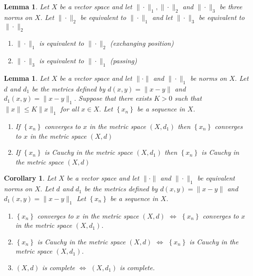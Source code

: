 \documentclass[10pt]{paper}
\newtheorem{corollary}{Corollary}[section]
\newtheorem{lemma}[theorem]{Lemma}
\begin{document}
\begin{lemma}
    Let $X$ be a vector space and let $\|\cdot\|_{1},\|\cdot\|_{2}$ and $\|\cdot\|_{3}$ be three norms on $X$. Let $\|\cdot\|_{2}$ be equivalent to $\|\cdot\|_{1}$ and let $\|\cdot\|_{3}$ be equivalent to $\|\cdot\|_{2}$
    \begin{enumerate}
        \item $\|\cdot\|_{1}$ is equivalent to $\|\cdot\|_{2}$ (exchanging position)
        \item $\|\cdot\|_{3}$ is equivalent to $\|\cdot\|_{1}$ (passing)
    \end{enumerate}
\end{lemma}

\begin{lemma}
    Let $X$ be a vector space and let $\|\cdot\|$ and $\|\cdot\|_{1}$ be norms on $X .$ Let $d$ and $d_{1}$ be the metrics defined by $d(x, y)=\|x-y\|$ and $d_{1}(x, y)=\|x-y\|_{1} .$ Suppose that there exists $K>0$ such that $\|x\| \leq K\|x\|_{1}$ for all $x \in X .$ Let $\left\{x_{n}\right\}$ be a sequence in $X$.
    \begin{enumerate}
        \item If $\left\{x_{n}\right\}$ converges to $x$ in the metric space $\left(X, d_{1}\right)$ then $\left\{x_{n}\right\}$ converges to $x$ in the metric space $(X, d)$
        \item If $\left\{x_{n}\right\}$ is Cauchy in the metric space $\left(X, d_{1}\right)$ then $\left\{x_{n}\right\}$ is Cauchy in the metric space $(X, d)$
    \end{enumerate}
\end{lemma}

\begin{corollary}
    Let $X$ be a vector space and let $\|\cdot\|$ and $\|\cdot\|_{1}$ be equivalent norms on $X .$ Let $d$ and $d_{1}$ be the metrics defined by $d(x, y)=\|x-y\|$ and $d_{1}(x, y)=\|x-y\|_{1}$ Let $\left\{x_{n}\right\}$ be a sequence in $X$.
    \begin{enumerate}
        \item $\left\{x_{n}\right\}$ converges to $x$ in the metric space $(X, d)$ $\iff$ $\left\{x_{n}\right\}$ converges to $x$ in the metric space $\left(X, d_{1}\right)$.
        \item $\left\{x_{n}\right\}$ is Cauchy in the metric space $(X, d)$ $\iff$ $\left\{x_{n}\right\}$ is Cauchy in the metric space $\left(X, d_{1}\right)$.
        \item $(X, d)$ is complete $\iff$ $\left(X, d_{1}\right)$ is complete.
    \end{enumerate}
\end{corollary}
\end{document}
